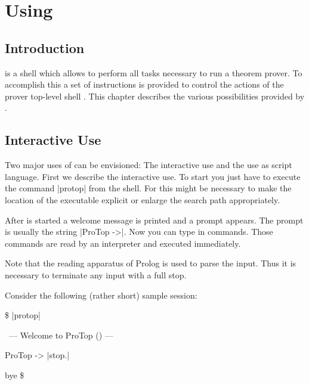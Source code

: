 
\chapter{Using \ProTop}

\section{Introduction}

\ProTop{} is a shell which allows to perform all tasks necessary to run a
theorem prover. To accomplish this a set of instructions is provided to
control the actions of the prover top-level shell \ProTop. This chapter
describes the various possibilities provided by \ProTop.


\section{Interactive Use}

Two major uses of \ProTop{} can be envisioned: The interactive use and the use
as script language. First we describe  the interactive use. To start \ProTop{}
you just have to execute  the command |protop| from the  shell. For this might
be necessary  to make the location of  the executable  explicit or enlarge the
search path appropriately.

After \ProTop{} is started a welcome message is printed and a prompt appears.
The prompt is usually the string |ProTop ->|. Now you can type in commands.
Those commands are read by an interpreter and executed immediately.

Note that the reading apparatus of Prolog is used to parse the input. Thus it
is necessary to terminate any input with a full stop.

Consider the following (rather short) sample session:

\begin{BoxedSample}
\$ |protop|
\

\                --- Welcome to ProTop (\Version) ---

ProTop -> |stop.|

bye
\$ 
\end{BoxedSample}

